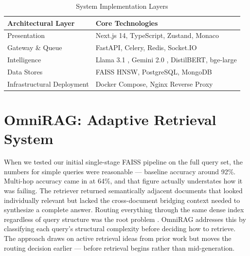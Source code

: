 \documentclass[conference]{IEEEtran}
\begin{document}
\begin{table}[htbp]
\caption{System Implementation Layers}
\begin{center}
\begin{tabularx}{\linewidth}{|l|X|}
\hline
\textbf{Architectural Layer} & \textbf{Core Technologies} \\
\hline
Presentation & Next.js 14, TypeScript, Zustand, Monaco \\
\hline
Gateway \& Queue & FastAPI, Celery, Redis, Socket.IO \\
\hline
Intelligence & Llama 3.1 \cite{dubey2024llama3}, Gemini 2.0 \cite{team2023gemini}, DistilBERT, bge-large \\
\hline
Data Stores & FAISS HNSW, PostgreSQL, MongoDB \\
\hline
Infrastructural Deployment & Docker Compose, Nginx Reverse Proxy \\
\hline
\end{tabularx}
\label{tab:techstack}
\end{center}
\end{table}

\section{OmniRAG: Adaptive Retrieval System}

When we tested our initial single-stage FAISS pipeline on the full query set, the numbers for simple queries were reasonable --- baseline accuracy around 92\%. Multi-hop accuracy came in at 64\%, and that figure actually understates how it was failing. The retriever returned semantically adjacent documents that looked individually relevant but lacked the cross-document bridging context needed to synthesize a complete answer. Routing everything through the same dense index regardless of query structure was the root problem \cite{gao2023ragsurvey}. OmniRAG addresses this by classifying each query's structural complexity before deciding how to retrieve. The approach draws on active retrieval ideas from prior work \cite{jiang2023flare} but moves the routing decision earlier --- before retrieval begins rather than mid-generation.
\end{document}
